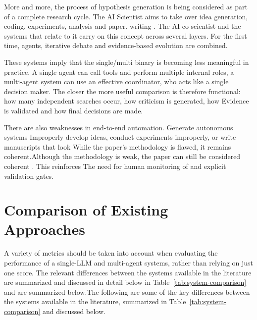 \documentclass[acmsmall,screen,review]{acmart}
\begin{document}
More and more, the process of hypothesis generation is being considered as part of a complete research cycle.
The AI Scientist aims to take over idea generation, coding, experiments, analysis and paper.
writing \cite{lu2024ai}. The AI co-scientist and the systems that relate to it carry on this concept across several layers.
For the first time, agents, iterative debate and evidence-based evolution \cite{gottweis2025towards} are combined.

These systems imply that the single/multi binary is becoming less meaningful in practice. A
single agent can call tools and perform multiple internal roles, a multi-agent system can use
an effective coordinator, who acts like a single decision maker. The closer the more useful comparison is
therefore functional: how many independent searches occur, how criticism is generated, how
Evidence is validated and how final decisions are made.

There are also weaknesses in end-to-end automation. Generate autonomous systems
Improperly develop ideas, conduct experiments improperly, or write manuscripts that look
While the paper's methodology is flawed, it remains coherent.Although the methodology is weak, the paper can still be considered coherent \cite{lu2024ai,yamada2026towards}. This reinforces
The need for human monitoring of and explicit validation gates.


\section{Comparison of Existing Approaches}
\label{sec:comparison}

A variety of metrics should be taken into account when evaluating the performance of a single-LLM and multi-agent systems, rather than relying on just one score. The relevant differences between the systems available in the literature are summarized and discussed in detail below in Table~\ref{tab:system-comparison} and are summarized below.The following are some of the key differences between the systems available in the literature, summarized in Table~\ref{tab:system-comparison} and discussed below.
\end{document}
